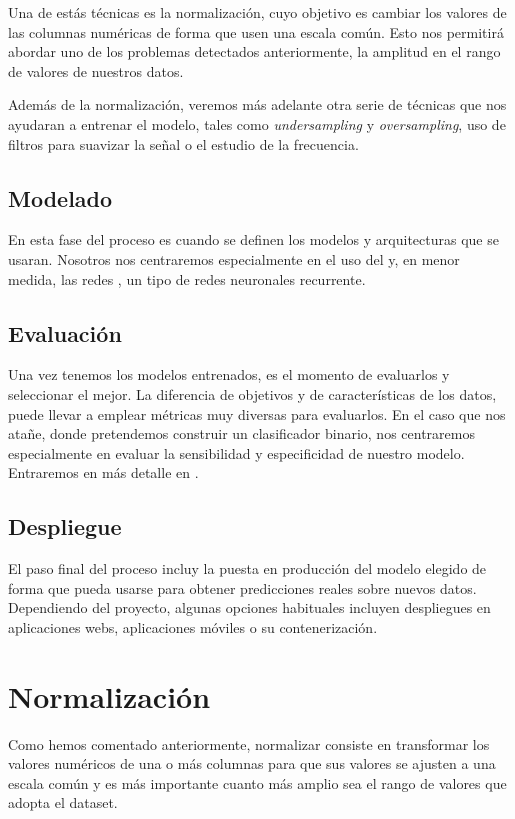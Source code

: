 Una de estás técnicas es la normalización, cuyo objetivo es cambiar los valores de las columnas numéricas de forma que usen una escala común. Esto nos permitirá abordar uno de los problemas detectados anteriormente, la amplitud en el rango de valores de nuestros datos.

Además de la normalización, veremos más adelante otra serie de técnicas que nos ayudaran a entrenar el modelo, tales como \textit{undersampling} y \textit{oversampling}, uso de filtros para suavizar la señal o el estudio de la frecuencia.

\subsection{Modelado}

En esta fase del proceso es cuando se definen los modelos y arquitecturas que se usaran. Nosotros nos centraremos especialmente en el uso del  y, en menor medida, las redes , un tipo de redes neuronales recurrente. 

\subsection{Evaluación}

Una vez tenemos los modelos entrenados, es el momento de evaluarlos y seleccionar el mejor. La diferencia de objetivos y de características de los datos, puede llevar a emplear métricas muy diversas para evaluarlos. En el caso que nos atañe, donde pretendemos construir un clasificador binario, nos centraremos especialmente en evaluar la sensibilidad y especificidad de nuestro modelo. Entraremos en más detalle en .

\subsection{Despliegue}

El paso final del proceso incluy la puesta en producción del modelo elegido de forma que pueda usarse para obtener predicciones reales sobre nuevos datos. Dependiendo del proyecto, algunas opciones habituales incluyen despliegues en aplicaciones webs, aplicaciones móviles o su contenerización.

\section{Normalización}
Como hemos comentado anteriormente, normalizar consiste en transformar los valores numéricos de una o más columnas para que sus valores se ajusten a una escala común y es más importante cuanto más amplio sea el rango de valores que adopta el dataset.  

